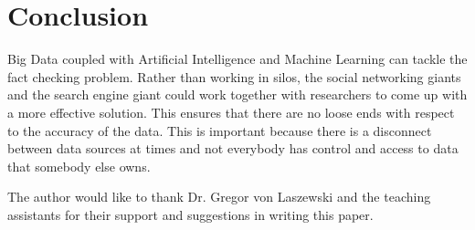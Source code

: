 \documentclass[sigconf]{acmart}
\begin{document}
\section{Conclusion}

Big Data coupled with Artificial Intelligence and Machine Learning can tackle the fact checking problem. Rather than working in silos, the social networking giants and the search engine giant could work together with researchers to come up with a more effective solution. This ensures that there are no loose ends with respect to the accuracy of the data. This is important because there is a disconnect between data sources at times and not everybody has control and access to data that somebody else owns.
    
\begin{acks}

The author would like to thank Dr. Gregor von Laszewski and the teaching assistants for their support and suggestions in writing this paper.

\end{acks}


 




\end{document}
